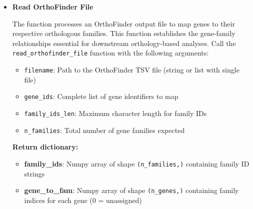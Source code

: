 \documentclass[11pt]{article}
\begin{document}
\begin{enumerate}
\begin{itemize}
	      	      \begin{lstlisting}[language=Python, caption={Python Read Expression Vectors}]
expression_vectors = read_expression_vectors(file_list, gene_ids, 
                                n_samples, n_header_rows, gene_col, 
                                value_cols, delimiter='\t')
	      	      \end{lstlisting}
	      	      
	      	\item \textbf{Read OrthoFinder File}
	      	      
	      	      The function processes an OrthoFinder output file to map genes to their
	      	      respective orthologous families. This function establishes the gene-family
	      	      relationships essential for downstream orthology-based analyses. Call the
	      	      \texttt{read\_orthofinder\_file} function with the following arguments:
	      	      
	      	      \begin{itemize}
	      	      	\item \texttt{filename}: Path to the OrthoFinder TSV file (string or
	      	      	      list with single file)
	      	      	      
	      	      	\item \texttt{gene\_ids}: Complete list of gene identifiers to map
	      	      	      
	      	      	\item \texttt{family\_ids\_len}: Maximum character length for family
	      	      	      IDs
	      	      	      
	      	      	\item \texttt{n\_families}: Total number of gene families expected
	      	      \end{itemize}
	      	      
	      	      \textbf{Return dictionary:}
	      	      \begin{itemize}
	      	      	\item \textbf{family\_ids}: Numpy array of shape \texttt{(n\_families,)}
	      	      	      containing family ID strings
	      	      	      
	      	      	\item \textbf{gene\_to\_fam}: Numpy array of shape \texttt{(n\_genes,)}
	      	      	      containing family indices for each gene (0 = unassigned)
	      	      \end{itemize}
	      	      

\end{itemize}
\end{enumerate}
\end{document}
